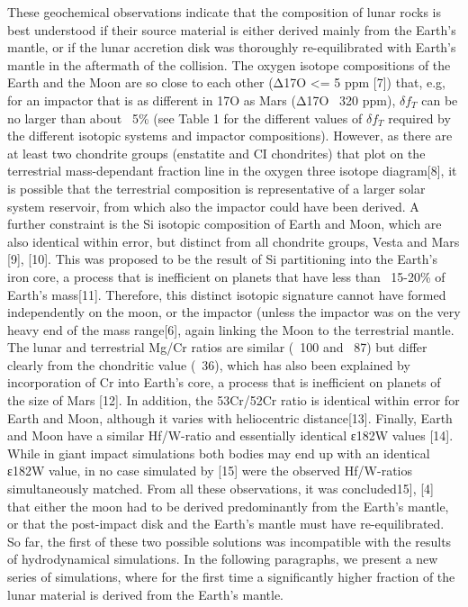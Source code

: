 These geochemical observations indicate that the composition of lunar rocks is best understood if their source material is either derived mainly from the Earth's mantle, or if the lunar accretion disk was thoroughly re-equilibrated with Earth's mantle in the aftermath of the collision. The oxygen isotope compositions of the Earth and the Moon are so close to each other (Δ17O  <= 5 ppm [7]) that, e.g, for an impactor that is as different in 17O as Mars (Δ17O ~320 ppm), $\delta f_{T}$ can be no larger than about ~5\% (see Table 1 for the different values of $\delta f_{T}$ required by the different isotopic systems and impactor compositions). However, as there are at least two chondrite groups (enstatite and CI chondrites) that plot on the terrestrial mass-dependant fraction line in the oxygen three isotope diagram[8], it is possible that the terrestrial composition is representative of a larger solar system reservoir, from which also the impactor could have been derived. A further constraint is the Si isotopic composition of Earth and Moon, which are also identical within error, but distinct from all chondrite groups, Vesta and Mars [9], [10]. This was proposed to be the result of Si partitioning into the Earth's iron core, a process that is inefficient on planets that have less than ~15-20\% of  Earth's mass[11]. Therefore, this distinct isotopic signature cannot have formed independently on the moon, or the impactor (unless the impactor was on the very heavy end of the mass range[6], again linking the Moon to the terrestrial mantle. The lunar and terrestrial Mg/Cr ratios are similar (~100 and ~87) but differ clearly from the chondritic value (~36), which has also been explained by incorporation of Cr into Earth's core, a process that is inefficient on planets of the size of Mars [12]. In addition, the 53Cr/52Cr ratio is identical within error for Earth and Moon, although it varies with heliocentric distance[13]. Finally, Earth and Moon have a similar Hf/W-ratio and essentially identical ε182W values [14]. While in giant impact simulations both bodies may end up with an identical ε182W value, in no case simulated by [15] were the observed Hf/W-ratios simultaneously matched. From all these observations, it was concluded15], [4] that either the moon had to be derived predominantly from the Earth's mantle, or that the post-impact disk and the Earth's mantle must have re-equilibrated. So far, the first of these two possible solutions was incompatible with the results of hydrodynamical simulations. In the following paragraphs, we present a new series of simulations, where for the first time a significantly higher fraction of the lunar material is derived from the Earth's mantle.

